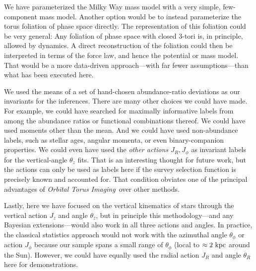 \documentclass[modern]{aastex63}
\newcommand{\methodname}{\textsl{Orbital Torus Imaging}}
\begin{document}
We have parameterized the Milky Way mass model with
a very simple, few-component mass model.
Another option would be to instead parameterize the torus foliation of phase
space directly.
The representation of this foliation could be very general: Any foliation of
phase space with closed 3-tori is, in principle, allowed by dynamics.
A direct reconstruction of the foliation could then be interpreted in terms of
the force law, and hence the potential or mass model.
That would be a more data-driven approach---with far fewer assumptions---than
what has been executed here.

We used the means of
a set of hand-chosen abundance-ratio deviations
as our invariants for the inferences.
There are many other choices we could have made.
For example, we could have searched for maximally informative labels from among
the abundance ratios or functional combinations thereof. We could have used
moments other than the mean. And we could have used non-abundance labels, such
as stellar ages, angular momenta, or even binary-companion properties.
We could even have used the \emph{other actions $J_R, J_\phi$}
as invariant labels for the vertical-angle $\theta_z$ fits.
That is an interesting thought for future work, but the actions can only be used
as labels here if the survey selection function is precisely known and accounted
for. That condition obviates one of the principal advantages of
\methodname\ over other methods.

Lastly, here we have focused on the vertical kinematics of stars through the
vertical action $J_z$ and angle $\theta_z$, but in principle this
methodology---and any Bayesian extensions---would also work in all three actions
and angles.
In practice, the classical statistics approach would not work with the azimuthal
angle $\theta_\phi$ or action $J_\phi$ because our sample spans a small range of
$\theta_\phi$ (local to $\approx 2~\mathrm{kpc}$ around the Sun).
However, we could have equally used the radial action $J_R$ and angle $\theta_R$
here for demonstrations.


\end{document}
